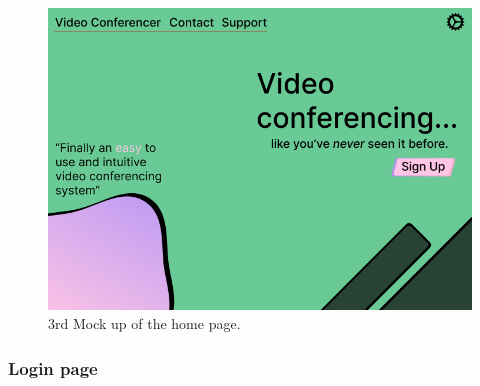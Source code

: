 \begin{figure}[H]
\centering

\includegraphics[scale=0.2]{Images/HomeUI_3.png}

\caption{3rd Mock up of the home page.}
\label{fig:ui3}
\end{figure}

\subsubsection{Login page}
